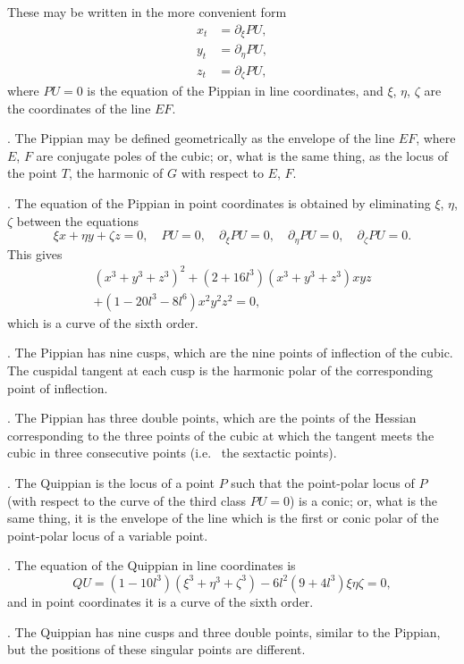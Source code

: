 \documentclass[12pt,a4paper]{article}
\theoremstyle{definition}
\newcommand{\ie}{i.e.\ }
\begin{document}
These may be written in the more convenient form
\begin{align*}
x_{t} &= \partial_{\xi}PU, \\
y_{t} &= \partial_{\eta}PU, \\
z_{t} &= \partial_{\zeta}PU,
\end{align*}
where $PU = 0$ is the equation of the Pippian in line coordinates,
and $\xi$, $\eta$, $\zeta$ are the coordinates of the line $EF$.

. The Pippian may be defined geometrically as the envelope
of the line $EF$, where $E$, $F$ are conjugate poles of the cubic;
or, what is the same thing, as the locus of the point $T$, the
harmonic of $G$ with respect to $E$, $F$.

. The equation of the Pippian in point coordinates is
obtained by eliminating $\xi$, $\eta$, $\zeta$ between the equations
\[
\xi x + \eta y + \zeta z = 0, \quad PU = 0, \quad \partial_{\xi}PU = 0, \quad
\partial_{\eta}PU = 0, \quad \partial_{\zeta}PU = 0.
\]
This gives
\begin{multline*}
(x^{3} + y^{3} + z^{3})^{2} + (2 + 16l^{3})(x^{3} + y^{3} + z^{3})xyz \\
+ (1 - 20l^{3} - 8l^{6})x^{2}y^{2}z^{2} = 0,
\end{multline*}
which is a curve of the sixth order.

. The Pippian has nine cusps, which are the nine points
of inflection of the cubic. The cuspidal tangent at each cusp
is the harmonic polar of the corresponding point of inflection.

. The Pippian has three double points, which are the
points of the Hessian corresponding to the three points of the
cubic at which the tangent meets the cubic in three consecutive
points (\ie{} the sextactic points).

. The Quippian is the locus of a point $P$ such that the
point-polar locus of $P$ (with respect to the curve of the third
class $PU = 0$) is a conic; or, what is the same thing, it is
the envelope of the line which is the first or conic polar of
the point-polar locus of a variable point.

. The equation of the Quippian in line coordinates is
\[
QU = (1 - 10l^{3})(\xi^{3} + \eta^{3} + \zeta^{3}) - 6l^{2}(9 + 4l^{3})\xi\eta\zeta = 0,
\]
and in point coordinates it is a curve of the sixth order.

. The Quippian has nine cusps and three double points,
similar to the Pippian, but the positions of these singular points
are different.
\end{document}

